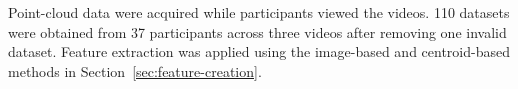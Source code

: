 %
Point-cloud data were acquired while participants viewed the videos.
110 datasets were obtained from 37 participants across three videos after removing one invalid dataset.
Feature extraction was applied using the image-based and centroid-based methods in Section~\ref{sec:feature-creation}.
